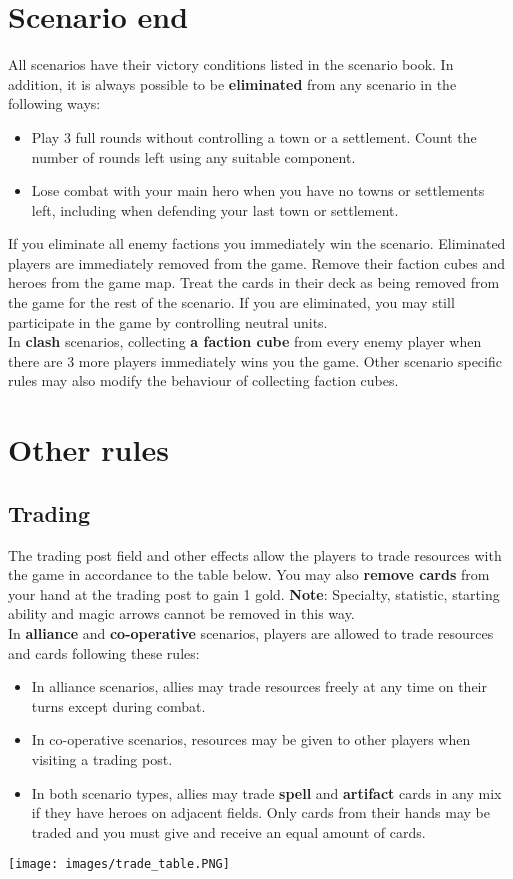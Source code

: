 \documentclass[12pt]{article}
\begin{document}
\section[Scenario end]{Scenario end\hypertarget{End}{}}
All scenarios have their victory conditions listed in the scenario book. In addition, it is always possible to be \textbf{eliminated} from any scenario in the following ways:
\begin{itemize}
    \item Play 3 full rounds without controlling a town or a settlement. Count the number of rounds left using any suitable component.
    \item Lose combat with your main hero when you have no towns or settlements left, including when defending your last town or settlement.
\end{itemize}
If you eliminate all enemy factions you immediately win the scenario. Eliminated players are immediately removed from the game. Remove their faction cubes and heroes from the game map. Treat the cards in their deck as being removed from the game for the rest of the scenario. If you are eliminated, you may still participate in the game by controlling neutral units.\\[6pt]
In \textbf{clash} scenarios, collecting \textbf{a faction cube} from every enemy player when there are 3 more players immediately wins you the game. Other scenario specific rules may also modify the behaviour of collecting faction cubes.
\clearpage

\section{Other rules}
\subsection*{\hypertarget{Trading}{Trading}}
The trading post field and other effects allow the players to trade resources with the game in accordance to the table below. You may also \textbf{remove cards} from your hand at the trading post to gain 1 gold. \textbf{Note}: Specialty, statistic, starting ability and magic arrows cannot be removed in this way.\\[6pt]
In \textbf{alliance} and \textbf{co-operative} scenarios, players are allowed to trade resources and cards following these rules:
\begin{itemize}
    \item In alliance scenarios, allies may trade resources freely at any time on their turns except during combat.
    \item In co-operative scenarios, resources may be given to other players when visiting a trading post.
    \item In both scenario types, allies may trade \textbf{spell} and \textbf{artifact} cards in any mix if they have heroes on adjacent fields. Only cards from their hands may be traded and you must give and receive an equal amount of cards.
\end{itemize}
\begin{center}
\texttt{[image: images/trade\_table.PNG]}
\end{center}
\clearpage
\end{document}
